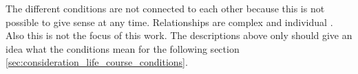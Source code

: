 The different conditions are not connected to each other because this is not possible to give sense at any time. Relationships are complex and individual \cite{sassler2010partnering}. Also this is not the focus of this work. The descriptions above only should give an idea what the conditions mean for the following section \ref{sec:consideration_life_course_conditions}.
